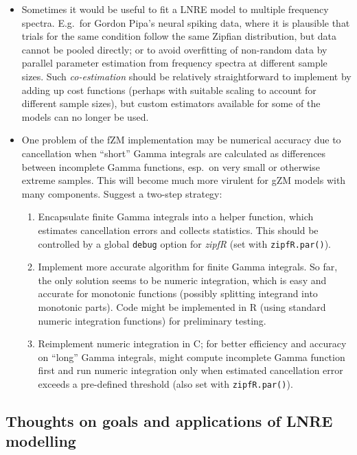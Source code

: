 \documentclass[a4paper]{article}
\begin{document}
\begin{itemize}
\item Sometimes it would be useful to fit a LNRE model to multiple frequency spectra. E.g.\ for Gordon Pipa's neural spiking data, where it is plausible that trials for the same condition follow the same Zipfian distribution, but data cannot be pooled directly; or to avoid overfitting of non-random data by parallel parameter estimation from frequency spectra at different sample sizes.  Such \emph{co-estimation}  should be relatively straightforward to implement by adding up cost functions (perhaps with suitable scaling to account for different sample sizes), but custom estimators available for some of the models can no longer be used.

\item One problem of the fZM implementation may be numerical accuracy due to cancellation when ``short'' Gamma integrals are calculated as differences between incomplete Gamma functions, esp.\ on very small or otherwise extreme samples.  This will become much more virulent for gZM models with many components.  Suggest a two-step strategy:
  \begin{enumerate}
  \item Encapsulate finite Gamma integrals into a helper function, which estimates cancellation errors and collects statistics.  This should be controlled by a global \texttt{debug} option for \emph{zipfR} (set with \texttt{zipfR.par()}).
  \item Implement more accurate algorithm for finite Gamma integrals.  So far, the only solution seems to be numeric integration, which is easy and accurate for monotonic functions (possibly splitting integrand into monotonic parts).  Code might be implemented in R (using standard numeric integration functions) for preliminary testing.
  \item Reimplement numeric integration in C; for better efficiency and accuracy on ``long'' Gamma integrals, might compute incomplete Gamma function first and run numeric integration only when estimated cancellation error exceeds a pre-defined threshold (also set with \texttt{zipfR.par()}).
  \end{enumerate}

\end{itemize}


\subsection{Thoughts on goals and applications of LNRE modelling}
\label{sec:notes:goals-applications}
\end{document}
